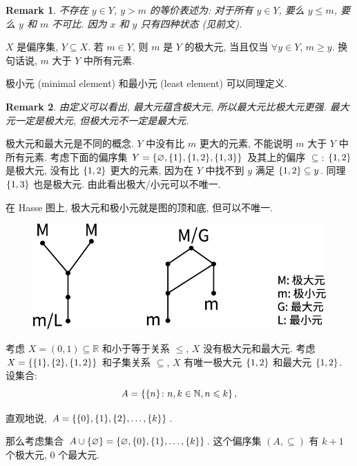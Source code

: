 \documentclass[UTF8]{ctexart}
\theoremstyle{mystyle}
\theoremstyle{myremark}
\newtheorem*{remark}{Remark}
\theoremstyle{plain}
\newcommand{\R}{\mathbb R}
\newcommand{\N}{\mathbb N}
\DeclarePairedDelimiter\set{\{}{\}}
\begin{document}
\begin{remark}
    不存在 $ y \in Y $, $ y > m $ 的等价表述为: 对于所有 $ y \in Y $, 要么 $ y \le m $, 要么 $ y $ 和 $ m $ 不可比. 因为 $ x $ 和 $ y $ 只有四种状态 (见前文).
\end{remark}

\begin{definition}
    $ X $ 是偏序集, $ Y \subseteq X $. 若 $ m \in Y $, 则 $ m $ 是 $ Y $ 的极大元, 当且仅当 $ \forall y \in Y $, $ m \ge y $. 换句话说, $ m $ 大于 $ Y $ 中所有元素.
\end{definition}

极小元 (minimal element) 和最小元 (least element) 可以同理定义.

\begin{remark}
    由定义可以看出, 最大元蕴含极大元, 所以最大元比极大元更强. 最大元一定是极大元, 但极大元不一定是最大元.
\end{remark}


极大元和最大元是不同的概念. $ Y $ 中没有比 $ m $ 更大的元素, 不能说明 $ m $ 大于 $ Y $ 中所有元素. 考虑下面的偏序集 $ Y = \set{\varnothing, \set{1}, \set{1, 2}, \set{1, 3}} $ 及其上的偏序 $ \subseteq $: $ \set{1, 2} $ 是极大元, 没有比 $ \set{1, 2} $ 更大的元素, 因为在 $ Y $ 中找不到 $ y $ 满足 $ \set{1, 2} \subseteq y $. 同理 $ \set{1, 3} $ 也是极大元. 由此看出极大/小元可以不唯一.

在 Hasse 图上, 极大元和极小元就是图的顶和底, 但可以不唯一. 

\begin{figure}[H]
    \centering
    \includegraphics[width = 0.6\linewidth]{./images/maximal_greatest.png}
\end{figure} 

考虑 $ X = (0, 1) \subseteq \R $ 和小于等于关系 $ \leqslant $, $ X $ 没有极大元和最大元. 考虑 $ X = \set{\set{1}, \set{2}, \set{1, 2}} $ 和子集关系 $ \subseteq $, $ X $ 有唯一极大元 $ \set{1, 2} $ 和最大元 $ \set{1, 2} $. 设集合:
\[ A = \set{\set{n} \colon n, k \in \N, n \leqslant k} \,,\]

直观地说, $ A = \set{\set{0}, \set{1}, \set{2}, \dots, \set{k}} $.

那么考虑集合 $ A \cup \set{\varnothing} = \set{\varnothing, \set{0}, \set{1}, \dots, \set{k}} $. 这个偏序集 $ (A, \subseteq) $ 有 $ k + 1 $ 个极大元, $ 0 $ 个最大元.
\end{document}
